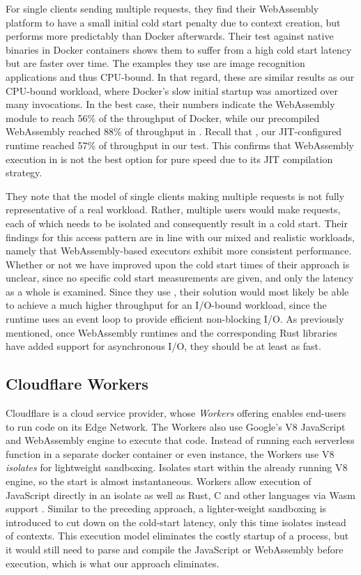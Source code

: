 For single clients sending multiple requests, they find their WebAssembly platform to have a small initial cold start penalty due to context creation, but performs more predictably than Docker afterwards. Their test against native binaries in Docker containers shows them to suffer from a high cold start latency but are faster over time. The examples they use are image recognition applications and thus CPU-bound. In that regard, these are similar results as our CPU-bound workload, where Docker's slow initial startup was amortized over many invocations.
In the best case, their numbers indicate the WebAssembly module to reach 56\% of the throughput of Docker, while our precompiled WebAssembly reached 88\% of throughput in . Recall that , our JIT-configured runtime reached 57\% of throughput in our test. This confirms that WebAssembly execution in  is not the best option for pure speed due to its JIT compilation strategy.

They note that the model of single clients making multiple requests is not fully representative of a real workload. Rather, multiple users would make requests, each of which needs to be isolated and consequently result in a cold start. Their findings for this access pattern are in line with our mixed and realistic workloads, namely that WebAssembly-based executors exhibit more consistent performance. Whether or not we have improved upon the cold start times of their approach is unclear, since no specific cold start measurements are given, and only the latency as a whole is examined. 
Since they use , their solution would most likely be able to achieve a much higher throughput for an I/O-bound workload, since the runtime uses an event loop to provide efficient non-blocking I/O. As previously mentioned, once WebAssembly runtimes and the corresponding Rust libraries have added support for asynchronous I/O, they should be at least as fast.

\subsection{Cloudflare Workers}

Cloudflare is a cloud service provider, whose \emph{Workers} offering enables end-users to run code on its Edge Network. The Workers also use Google's V8 JavaScript and WebAssembly engine to execute that code.
Instead of running each serverless function in a separate docker container or even  instance, the Workers use V8 \emph{isolates} for lightweight sandboxing. Isolates start within the already running V8 engine, so the start is almost instantaneous.
Workers allow execution of JavaScript directly in an isolate as well as Rust, C and other languages via Wasm support \cite{Cloudflare2021}.
Similar to the preceding approach, a lighter-weight sandboxing is introduced to cut down on the cold-start latency, only this time isolates instead of contexts. This execution model eliminates the costly startup of a  process, but it would still need to parse and compile the JavaScript or WebAssembly before execution, which is what our approach eliminates.

